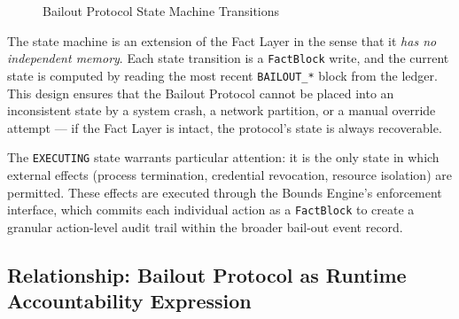 \begin{figure}[htbp]
    \centering
    \caption{Bailout Protocol State Machine Transitions}
    \label{fig:bailout-state-machine}
\end{figure}

The state machine is an extension of the Fact Layer in the sense that it \textit{has no independent memory}. Each state transition is a \texttt{FactBlock} write, and the current state is computed by reading the most recent \texttt{BAILOUT\_*} block from the ledger. This design ensures that the Bailout Protocol cannot be placed into an inconsistent state by a system crash, a network partition, or a manual override attempt — if the Fact Layer is intact, the protocol's state is always recoverable.

The \texttt{EXECUTING} state warrants particular attention: it is the only state in which external effects (process termination, credential revocation, resource isolation) are permitted. These effects are executed through the Bounds Engine's enforcement interface, which commits each individual action as a \texttt{FactBlock} to create a granular action-level audit trail within the broader bail-out event record.

\subsection{Relationship: Bailout Protocol as Runtime Accountability Expression}
\label{sec:bailout-runtime-accountability}

